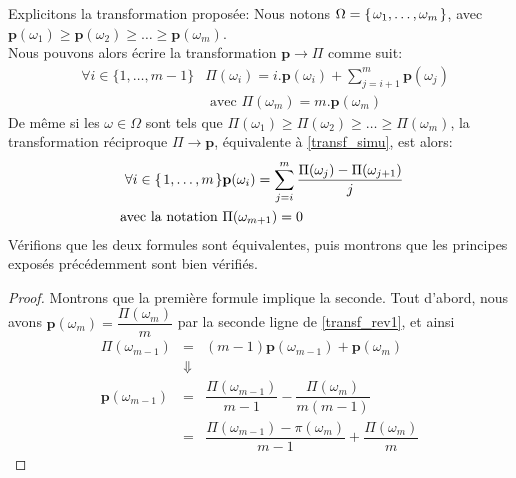 {Explicitons la transformation proposée:
Nous notons $\Omega= \left\{ \left. \omega_1,\ldots,\omega_m \right. \right\}$, avec
$\mathbf{p}(\omega_1) \geqslant \mathbf{p}(\omega_2) \geqslant \ldots \geqslant \mathbf{p}(\omega_m)$. \\
Nous pouvons alors écrire la transformation $\mathbf{p} \rightarrow \Pi$ comme suit:
\begin{eqnarray}
\label{transf_rev1} & \forall i \in \{1,\ldots,m-1 \} &  \Pi(\omega_i) = i.\mathbf{p}(\omega_i) + \sum_{j=i+1}^m \mathbf{p}(\omega_j)   \\
\nonumber & & \mbox{ avec  } \Pi(\omega_m)=m.\mathbf{p}(\omega_m) 
\end{eqnarray}
De même si les $\omega \in \Omega$ sont tels que $\Pi(\omega_1) \geqslant \Pi(\omega_2) \geqslant \ldots \geqslant \Pi(\omega_m)$, la transformation réciproque $\Pi \rightarrow \mathbf{p}$, équivalente à \ref{transf_simu}, est alors:
\begin{eqnarray}
\label{transf_rec} \forall i \in \left\{ \left. 1,\ldots,m \right. \right\} & \mathbf{p}(\omega_i) =\displaystyle \sum_{j=i}^m \dfrac{\Pi(\omega_j)-\Pi(\omega_{j+1})}{j} \\
\nonumber \mbox{ avec la notation } &  \Pi(\omega_{m+1}) =0
\end{eqnarray}
Vérifions que les deux formules sont équivalentes, puis montrons que les principes exposés précédemment sont bien vérifiés.
\begin{proof}
Montrons que la première formule implique la seconde. Tout d'abord, nous avons
 $\mathbf{p}(\omega_m) = \dfrac{\Pi(\omega_m)}{m} $ par la seconde ligne de \ref{transf_rev1}, et ainsi
\begin{eqnarray*}
 \Pi(\omega_{m-1}) & = & (m-1) \mathbf{p}(\omega_{m-1}) + \mathbf{p}(\omega_m)  \\
& \Downarrow & \\ 
\mathbf{p}(\omega_{m-1}) & = & \dfrac{\Pi(\omega_{m-1})}{m-1} - \dfrac{\Pi(\omega_m)}{m(m-1)} \\
 & = & \dfrac{\Pi(\omega_{m-1}) - \pi(\omega_m)}{m-1} + \dfrac{\Pi(\omega_m)}{m}
\end{eqnarray*}


\end{proof}}
